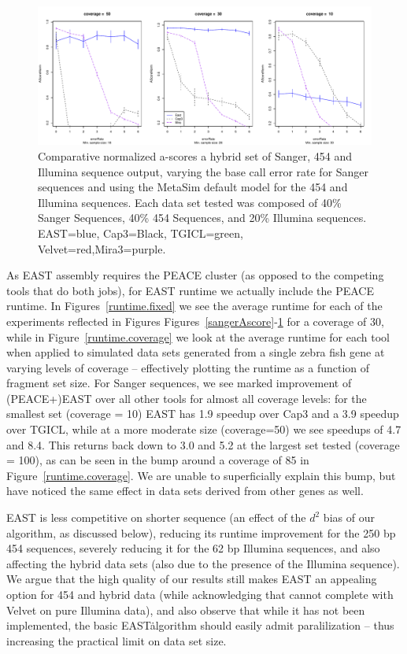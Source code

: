 \documentclass[10pt]{bmc_article}
\newcommand{\peace} {{\small PEACE}}
\newcommand{\capthree} {{\small Cap3}}
\newcommand{\tgicl} {{\small TGICL}}
\newcommand{\east} {{\small EAST}}
\newcommand{\velvet}{{\small Velvet}}
\newcommand{\mira}{{\small Mira3}}
\newenvironment{bmcformat}{\begin{raggedright}\baselineskip20pt\sloppy\setboolean{publ}{false}}{\end{raggedright}\baselineskip20pt\sloppy}
\begin{document}
\begin{bmcformat}
\begin{figure}[htb]
\centerline{\includegraphics[width=6in]{pics.d/ascore_hybrid.pdf}}
\caption{Comparative normalized a-scores a hybrid set of Sanger, 454
  and Illumina sequence output, varying the base call error rate for
  Sanger sequences and using the MetaSim default model for the 454 and
  Illumina sequences.  Each data set tested was composed of 40\%
  Sanger Sequences, 40\% 454 Sequences, and 20\% Illumina sequences.
  \east=blue, \capthree=Black, \tgicl=green,
  \velvet=red,\mira=purple.}
\label{hybridAscore}
\end{figure}

 As \east\/ assembly requires the
\peace\/ cluster (as opposed to the competing tools that do both
jobs), for \east\/ runtime we actually include the \peace\/
runtime. In Figures~\ref{runtime.fixed} we see the average runtime for
each of the experiments reflected in Figures
Figures~\ref{sangerAscore}-\ref{hybridAscore} for a coverage of 30,
while in Figure~\ref{runtime.coverage} we look at the average runtime
for each tool when applied to simulated data sets generated from a
single zebra fish gene at varying levels of coverage -- effectively
plotting the runtime as a function of fragment set size.  For Sanger
sequences, we see marked improvement of (\peace+)\east\/ over all
other tools for almost all coverage levels: for the smallest set
(coverage = 10) \east\/ has 1.9 speedup over \capthree\/ and a 3.9
speedup over \tgicl, while at a more moderate size (coverage=50) we
see speedups of 4.7 and 8.4.  This returns back down to 3.0 and 5.2 at the
largest set tested (coverage = 100), as can be seen in the bump around
a coverage of 85 in Figure~\ref{runtime.coverage}.  We are unable to
superficially explain this bump, but have noticed the same effect in
data sets derived from other genes as well.

\east\/ is less competitive on shorter sequence (an effect of the
$d^2$ bias of our algorithm, as discussed below), reducing its runtime
improvement for the 250 bp 454 sequences, severely reducing it for the
62 bp Illumina sequences, and also affecting the hybrid data sets (also
due to the presence of the Illumina sequence).  We argue that the high
quality of our results still makes \east\/ an appealing option for 454
and hybrid data (while acknowledging that cannot complete with
\velvet\/ on pure Illumina data), and also observe that while it has
not been implemented, the basic \east\. algorithm should easily admit
paralilization -- thus increasing the practical limit on data set size.


\end{bmcformat}
\end{document}
